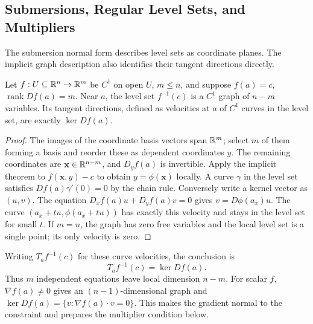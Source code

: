 \subsection{Submersions, Regular Level Sets, and Multipliers}
\label{sec:ift-consequences}
The submersion normal form describes level sets as coordinate planes.
The implicit graph description also identifies their tangent directions directly.
\begin{corollary}\label{cor:regular-level-set}
Let $f:U\subseteq\mathbb{R}^n\to\mathbb{R}^m$ be $C^1$ on open $U$, $m\leq n$, and suppose
$f(a)=c$, $\operatorname{rank}Df(a)=m$. Near $a$, the level set
$f^{-1}(c)$ is a $C^1$ graph of $n-m$ variables. Its tangent directions,
defined as velocities at $a$ of $C^1$ curves in the level set, are exactly
$\ker Df(a)$.
\end{corollary}
\begin{proof}
The images of the coordinate basis vectors span $\mathbb{R}^m$; select $m$ of
them forming a basis and reorder these as dependent coordinates $y$.
The remaining coordinates are $\mathbf{x}\in\mathbb{R}^{n-m}$, and $D_yf(a)$ is invertible.
Apply the implicit theorem to $f(\mathbf{x},y)-c$ to obtain $y=\phi(\mathbf{x})$ locally.
A curve $\gamma$ in the level set satisfies $Df(a)\gamma'(0)=0$ by
the chain rule. Conversely write a kernel vector as $(u,v)$. The equation
$D_xf(a)u+D_yf(a)v=0$ gives $v=D\phi(a_x)u$.
The curve $(a_x+tu,\phi(a_x+tu))$ has exactly this velocity and stays
in the level set for small $t$. If $m=n$, the graph has zero free
variables and the local level set is a single point; its only velocity is zero.
\end{proof}
Writing $T_af^{-1}(c)$ for these curve velocities, the conclusion is
\[
T_af^{-1}(c)=\ker Df(a).
\]
Thus $m$ independent equations leave local dimension $n-m$.
For scalar $f$, $\nabla f(a)\ne0$ gives an $(n-1)$-dimensional graph and
$\ker Df(a)=\{v:\nabla f(a)\cdot v=0\}$. This makes the gradient normal
to the constraint and prepares the multiplier condition below.


